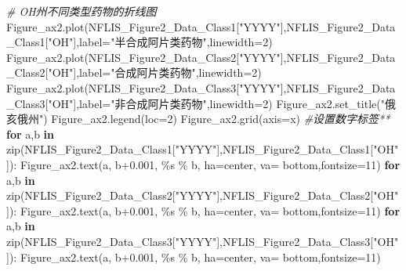 \documentclass[
]{article}
\newenvironment{Shaded}{}{}
\newcommand{\BuiltInTok}[1]{#1}
\newcommand{\CommentTok}[1]{\textcolor[rgb]{0.38,0.63,0.69}{\textit{#1}}}
\newcommand{\ControlFlowTok}[1]{\textcolor[rgb]{0.00,0.44,0.13}{\textbf{#1}}}
\newcommand{\DecValTok}[1]{\textcolor[rgb]{0.25,0.63,0.44}{#1}}
\newcommand{\FloatTok}[1]{\textcolor[rgb]{0.25,0.63,0.44}{#1}}
\newcommand{\KeywordTok}[1]{\textcolor[rgb]{0.00,0.44,0.13}{\textbf{#1}}}
\newcommand{\NormalTok}[1]{#1}
\newcommand{\OperatorTok}[1]{\textcolor[rgb]{0.40,0.40,0.40}{#1}}
\newcommand{\SpecialCharTok}[1]{\textcolor[rgb]{0.25,0.44,0.63}{#1}}
\newcommand{\StringTok}[1]{\textcolor[rgb]{0.25,0.44,0.63}{#1}}
\begin{document}
\begin{Shaded}
\begin{Highlighting}[]
\CommentTok{\# OH州不同类型药物的折线图}
\NormalTok{Figure\_ax2.plot(NFLIS\_Figure2\_Data\_Class1[}\StringTok{"YYYY"}\NormalTok{],NFLIS\_Figure2\_Data\_Class1[}\StringTok{"OH"}\NormalTok{],label}\OperatorTok{=}\StringTok{"半合成阿片类药物"}\NormalTok{,linewidth}\OperatorTok{=}\DecValTok{2}\NormalTok{)}
\NormalTok{Figure\_ax2.plot(NFLIS\_Figure2\_Data\_Class2[}\StringTok{"YYYY"}\NormalTok{],NFLIS\_Figure2\_Data\_Class2[}\StringTok{"OH"}\NormalTok{],label}\OperatorTok{=}\StringTok{"合成阿片类药物"}\NormalTok{,linewidth}\OperatorTok{=}\DecValTok{2}\NormalTok{)}
\NormalTok{Figure\_ax2.plot(NFLIS\_Figure2\_Data\_Class3[}\StringTok{"YYYY"}\NormalTok{],NFLIS\_Figure2\_Data\_Class3[}\StringTok{"OH"}\NormalTok{],label}\OperatorTok{=}\StringTok{"非合成阿片类药物"}\NormalTok{,linewidth}\OperatorTok{=}\DecValTok{2}\NormalTok{)}
\NormalTok{Figure\_ax2.set\_title(}\StringTok{"俄亥俄州"}\NormalTok{)}
\NormalTok{Figure\_ax2.legend(loc}\OperatorTok{=}\DecValTok{2}\NormalTok{)}
\NormalTok{Figure\_ax2.grid(axis}\OperatorTok{=}\StringTok{\textquotesingle{}x\textquotesingle{}}\NormalTok{)}
 \CommentTok{\#设置数字标签**}
\ControlFlowTok{for}\NormalTok{ a,b }\KeywordTok{in} \BuiltInTok{zip}\NormalTok{(NFLIS\_Figure2\_Data\_Class1[}\StringTok{"YYYY"}\NormalTok{],NFLIS\_Figure2\_Data\_Class1[}\StringTok{"OH"}\NormalTok{]):}
\NormalTok{    Figure\_ax2.text(a, b}\OperatorTok{+}\FloatTok{0.001}\NormalTok{, }\StringTok{\textquotesingle{}}\SpecialCharTok{\%s}\StringTok{\textquotesingle{}} \OperatorTok{\%}\NormalTok{ b, ha}\OperatorTok{=}\StringTok{\textquotesingle{}center\textquotesingle{}}\NormalTok{, va}\OperatorTok{=} \StringTok{\textquotesingle{}bottom\textquotesingle{}}\NormalTok{,fontsize}\OperatorTok{=}\DecValTok{11}\NormalTok{)}
\ControlFlowTok{for}\NormalTok{ a,b }\KeywordTok{in} \BuiltInTok{zip}\NormalTok{(NFLIS\_Figure2\_Data\_Class2[}\StringTok{"YYYY"}\NormalTok{],NFLIS\_Figure2\_Data\_Class2[}\StringTok{"OH"}\NormalTok{]):}
\NormalTok{    Figure\_ax2.text(a, b}\OperatorTok{+}\FloatTok{0.001}\NormalTok{, }\StringTok{\textquotesingle{}}\SpecialCharTok{\%s}\StringTok{\textquotesingle{}} \OperatorTok{\%}\NormalTok{ b, ha}\OperatorTok{=}\StringTok{\textquotesingle{}center\textquotesingle{}}\NormalTok{, va}\OperatorTok{=} \StringTok{\textquotesingle{}bottom\textquotesingle{}}\NormalTok{,fontsize}\OperatorTok{=}\DecValTok{11}\NormalTok{)}
\ControlFlowTok{for}\NormalTok{ a,b }\KeywordTok{in} \BuiltInTok{zip}\NormalTok{(NFLIS\_Figure2\_Data\_Class3[}\StringTok{"YYYY"}\NormalTok{],NFLIS\_Figure2\_Data\_Class3[}\StringTok{"OH"}\NormalTok{]):}
\NormalTok{    Figure\_ax2.text(a, b}\OperatorTok{+}\FloatTok{0.001}\NormalTok{, }\StringTok{\textquotesingle{}}\SpecialCharTok{\%s}\StringTok{\textquotesingle{}} \OperatorTok{\%}\NormalTok{ b, ha}\OperatorTok{=}\StringTok{\textquotesingle{}center\textquotesingle{}}\NormalTok{, va}\OperatorTok{=} \StringTok{\textquotesingle{}bottom\textquotesingle{}}\NormalTok{,fontsize}\OperatorTok{=}\DecValTok{11}\NormalTok{)}
    

\end{Highlighting}
\end{Shaded}
\end{document}

